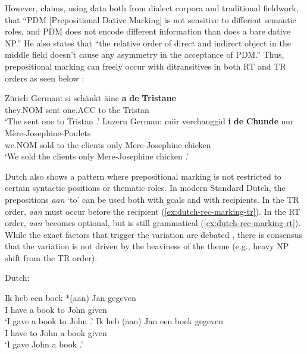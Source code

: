 	However, \cite{Seiler.2001} claims, using data both from dialect corpora and traditional fieldwork, that ``PDM [Prepositional Dative Marking] is not sensitive to different semantic roles, and PDM does not encode different information than does a bare dative NP.'' He also states that ``the relative order of direct and indirect object in the middle field doesn't cause any asymmetry in the acceptance of PDM.'' Thus, prepositional marking can freely occur with ditransitives in both RT and TR orders as seen below \citep{Seiler.2001,Seiler.2003}:
	\begin{exe}
		\ex Zürich German:\label{ex:zurich}
		\gll si schänkt äine \textbf{a} \textbf{de} \textbf{Tristane}\\
		they.NOM sent one.ACC to the Tristan\\
		\trans `The sent one to Tristan \citep[pg. 175]{Seiler.2003}.'
		\ex Luzern German:\label{ex:luzern}
		\gll miir verchauggid \textbf{i} \textbf{de} \textbf{Chunde} nur Mère-Josephine-Poulets\\
		we.NOM sold to the clients only Mere-Josephine chicken\\
		`We sold the clients only Mere-Josephine chicken \citep[pg. 175]{Seiler.2003}.'

	\end{exe}
	Dutch also shows a pattern where prepositional marking is not restricted to certain syntactic positions or thematic roles. In modern Standard Dutch, the prepositions \textit{aan} `to' can be used both with goals and with recipients. In the TR order, \textit{aan} must occur before the recipient (\ref{ex:dutch-rec-marking-tr}). In the RT order, \textit{aan} becomes optional, but is still grammatical (\ref{ex:dutch-rec-marking-rt}). While the exact factors that trigger the variation are debated \citep{vanBelle.1996b,Colleman.2010b}, there is consensus that the variation is not driven by the heaviness of the theme (e.g., heavy NP shift from the TR order). 
	\begin{exe}
		\ex Dutch:\label{ex:dutch-rec-marking}
		\begin{xlist}
			\ex \label{ex:dutch-rec-marking-tr}\gll Ik heb een boek *(aan) Jan gegeven\\
			I have a book to John given\\
			\trans `I gave a book to John \citep{Tiersma.1985}.'
			\ex \label{ex:dutch-rec-marking-rt}\gll Ik heb (aan) Jan een boek gegeven\\
			I have to John a book given\\
			\trans `I gave John a book \citep{Tiersma.1985}.'
		\end{xlist}
	\end{exe}
